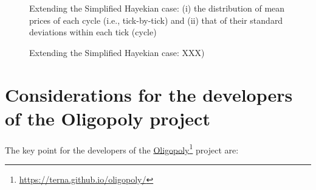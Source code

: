 \documentclass[10pt]{report}
\begin{document}
\begin{appendices}
\begin{figure}[H]
\begin{center}
\caption{Extending the Simplified Hayekian case: (i) the distribution of mean prices of each cycle (i.e., tick-by-tick) and (ii) that of their standard deviations within each tick (cycle)}
\label{output_3_3B2.png}
\end{center}
\end{figure}

\begin{figure}[H]
\begin{center}
\caption{Extending the Simplified Hayekian case: XXX)}
\label{output_4_0B2.png}
\end{center}
\end{figure}

\section{Considerations for the developers of the Oligopoly project}

The key point for the developers of the \href{https://terna.github.io/oligopoly/}{Oligopoly}\footnote{\url{https://terna.github.io/oligopoly/}} project are:

\end{appendices}

\clearpage
{}




\clearpage
{}
\printindex
\end{document}
